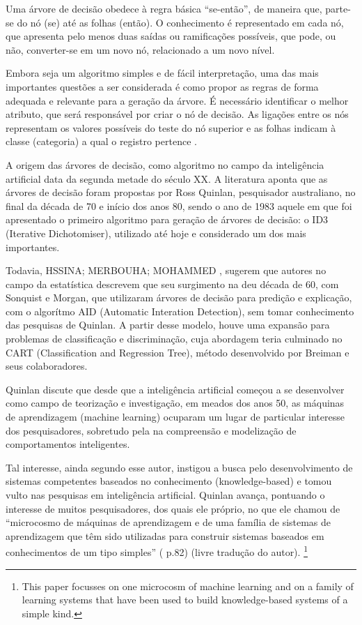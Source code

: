Uma árvore de decisão obedece à regra básica “se-então”, de maneira que, parte-se do nó (se) até as folhas (então). O conhecimento é representado em cada nó, que apresenta pelo menos duas saídas ou ramificações possíveis, que pode, ou não, converter-se em um novo nó, relacionado a um novo nível. 

Embora seja um algoritmo simples e de fácil interpretação, uma das mais importantes questões a ser considerada é como propor as regras de forma adequada e relevante para a geração da árvore. É necessário identificar o melhor atributo, que será  responsável por criar o nó de decisão. As ligações entre os nós representam os valores possíveis do teste do nó superior e as folhas indicam à classe (categoria) a qual o registro pertence \cite{Camilo}.

A origem das árvores de decisão, como algoritmo no campo da inteligência artificial data da segunda metade do século XX. A literatura aponta que as árvores de decisão foram propostas por Ross Quinlan, pesquisador australiano, no final da década de 70 e início dos anos 80, sendo o ano de 1983 aquele em que foi apresentado o primeiro algoritmo para geração de árvores de decisão: o ID3 (Iterative Dichotomiser),  utilizado até hoje e considerado um dos mais importantes.  

Todavia, HSSINA; MERBOUHA; MOHAMMED \cite{Decision2014}, sugerem que autores no campo da estatística descrevem que seu surgimento na deu década de 60, com Sonquist e Morgan, que utilizaram árvores de decisão para predição e explicação, com o algorítmo AID (Automatic Interation Detection), sem tomar conhecimento das pesquisas de Quinlan. A partir desse modelo, houve uma expansão para problemas de classificação e discriminação, cuja abordagem teria culminado no CART (Classification and Regression Tree), método desenvolvido por Breiman e seus colaboradores.

Quinlan \cite{Quinlan86inductionof} discute que desde que a inteligência artificial começou a se desenvolver como campo de teorização e investigação, em meados dos anos 50, as máquinas de aprendizagem (machine learning) ocuparam um lugar de particular interesse dos pesquisadores, sobretudo pela na compreensão e modelização de comportamentos inteligentes. 

Tal interesse, ainda segundo esse autor, instigou a busca pelo desenvolvimento de sistemas competentes baseados no conhecimento (knowledge-based) e tomou vulto nas pesquisas em inteligência artificial. Quinlan \cite{Quinlan86inductionof} avança, pontuando o interesse de muitos pesquisadores, dos quais ele próprio, no que ele chamou de “microcosmo de máquinas de aprendizagem e de uma família de sistemas de aprendizagem que têm sido utilizadas para construir sistemas baseados em conhecimentos de um tipo simples” ( p.82) (livre tradução do autor). \footnote{This paper focusses on one microcosm of machine learning and on a family of learning systems that have been used to build knowledge-based systems of a simple kind.}

